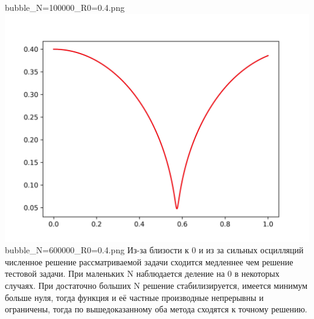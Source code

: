 \documentclass[a4paper,14pt]{article}
\begin{document}
bubble\_N=100000\_R0=0.4.png\newline
\includegraphics[scale=0.5]{images/graphs/bubble_N=600000_R0=0.4.png}\newline
bubble\_N=600000\_R0=0.4.png\newline
Из-за близости к 0 и из за сильных осцилляций численное решение рассматриваемой задачи сходится медленнее чем решение тестовой задачи. При маленьких N наблюдается деление на 0 в некоторых случаях. При достаточно больших N решение стабилизируется, имеется минимум больше нуля, тогда функция и её частные производные непрерывны и ограничены, тогда по вышедоказанному оба метода сходятся к точному решению.\newpage
\end{document}

